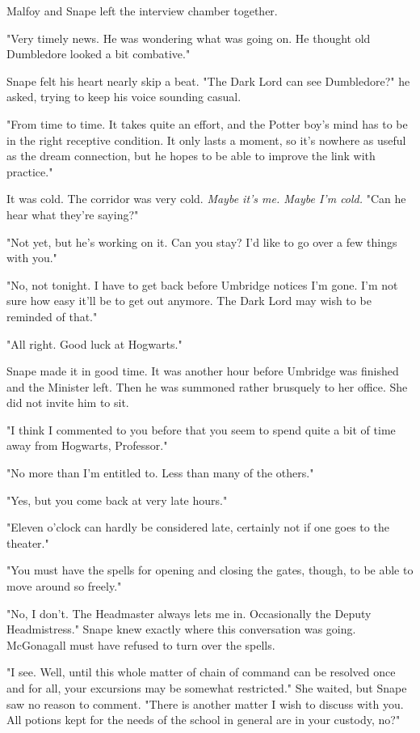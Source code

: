 \sbreak

Malfoy and Snape left the interview chamber together.

"Very timely news. He was wondering what was going on. He thought old Dumbledore looked a bit combative."

Snape felt his heart nearly skip a beat. "The Dark Lord can see Dumbledore?" he asked, trying to keep his voice sounding casual.

"From time to time. It takes quite an effort, and the Potter boy's mind has to be in the right receptive condition. It only lasts a moment, so it's nowhere as useful as the dream connection, but he hopes to be able to improve the link with practice."

It was cold. The corridor was very cold. \emph{Maybe it's me. Maybe I'm cold.} "Can he hear what they're saying?"

"Not yet, but he's working on it. Can you stay? I'd like to go over a few things with you."

"No, not tonight. I have to get back before Umbridge notices I'm gone. I'm not sure how easy it'll be to get out anymore. The Dark Lord may wish to be reminded of that."

"All right. Good luck at Hogwarts."

Snape made it in good time. It was another hour before Umbridge was finished and the Minister left. Then he was summoned rather brusquely to her office. She did not invite him to sit.

"I think I commented to you before that you seem to spend quite a bit of time away from Hogwarts, Professor."

"No more than I'm entitled to. Less than many of the others."

"Yes, but you come back at very late hours."

"Eleven o'clock can hardly be considered late, certainly not if one goes to the theater."

"You must have the spells for opening and closing the gates, though, to be able to move around so freely."

"No, I don't. The Headmaster always lets me in. Occasionally the Deputy Headmistress." Snape knew exactly where this conversation was going. McGonagall must have refused to turn over the spells.

"I see. Well, until this whole matter of chain of command can be resolved once and for all, your excursions may be somewhat restricted." She waited, but Snape saw no reason to comment. "There is another matter I wish to discuss with you. All potions kept for the needs of the school in general are in your custody, no?"


